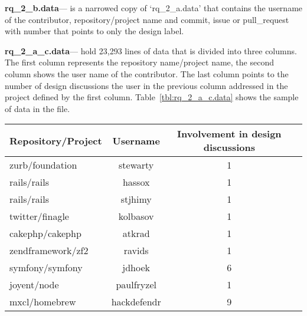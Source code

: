\noindent\textbf{rq\_2\_b.data}--- is a narrowed copy of `rq\_2\_a.data' that contains the username of the contributor, repository/project name and commit, issue or pull\_request with number that points to only the design label.

\noindent\textbf{rq\_2\_a\_c.data}--- hold 23,293 lines of data that is divided into three columns. The first column represents the repository name/project name, the second column shows the user name of the contributor. The last column points to the number of design discussions the user in the previous column addressed in the project defined by the first column. Table~\ref{tbl:rq_2_a_c.data} shows the sample of data in the file.  
\begin{table*}
	\centering
	\caption{Data sample in rq\_2\_a\_c.data}
	\label{tbl:rq_2_a_c.data}
	\begin{tabular}{lccc} 
		\toprule
		\textbf{Repository/Project} & \textbf{Username} & \textbf{Involvement in design discussions}   \\
		\midrule
		zurb/foundation & stewarty & 1 \\
		rails/rails & hassox & 1 \\
		rails/rails & stjhimy & 1 \\
		twitter/finagle & kolbasov & 1 \\
		cakephp/cakephp & atkrad & 1 \\
		zendframework/zf2 & ravids & 1 \\
		symfony/symfony & jdhoek & 6 \\
		joyent/node & paulfryzel & 1 \\
		mxcl/homebrew & hackdefendr & 9 \\
		\bottomrule
	\end{tabular}
\end{table*}

   